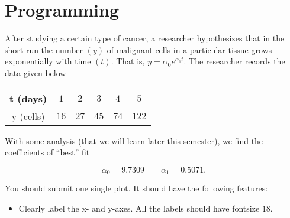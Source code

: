 \documentclass[answers,10pt]{exam}
\begin{document}
\section*{Programming}



\begin{questions} 

\question [10]  After studying a certain type of cancer, a researcher hypothesizes that in the short run the number $(y)$ of malignant cells in a particular tissue grows exponentially with time $(t)$. That is, $y=\alpha_0 e^{\alpha_1 t}$.  The researcher records the data given below

\begin{center}

\begin{tabular}{c|ccccc}

t (days) & $1$ & $2$ & $3$ & $4$ & $5$ \\ \hline

y (cells) & $16$ & $27$ & $45$ & $74$ & $122$

\end{tabular}

\end{center}

With some analysis (that we will learn later this semester), we find the coefficients of ``best'' fit

 \[ \alpha_0 = 9.7309 \qquad \alpha_1 = 0.5071.\] 


 You should submit one single plot. It should have the following features:

\begin{itemize}

\item Clearly label the x- and y-axes. All the labels should have fontsize $18$. 


\end{itemize}
\end{questions}
\end{document}
